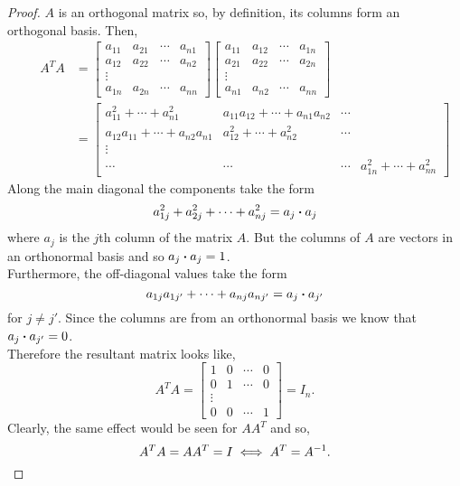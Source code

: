 \documentclass[../MathsNotesBase.tex]{subfiles}
\begin{document}
{		\bigskip
		\begin{proof}
			$A$ is an orthogonal matrix so, by definition, its columns form an orthogonal basis. Then,
			\begin{align*}
				&& A^TA &=
				\begin{bmatrix}
					a_{11} & a_{21} & \cdots & a_{n1}\\
					a_{12} & a_{22} & \cdots & a_{n2}\\
					\vdots \\
					a_{1n} & a_{2n} & \cdots & a_{nn}
				\end{bmatrix}
				\begin{bmatrix}
					a_{11} & a_{12} & \cdots & a_{1n}\\
					a_{21} & a_{22} & \cdots & a_{2n}\\
					\vdots \\
					a_{n1} & a_{n2} & \cdots & a_{nn}
				\end{bmatrix} \\
				&&  &= \begin{bmatrix}
					a_{11}^2 + \cdots + a_{n1}^2 & a_{11}a_{12} + \cdots + a_{n1}a_{n2} & \cdots\\
					a_{12}a_{11} + \cdots + a_{n2}a_{n1} & a_{12}^2 + \cdots + a_{n2}^2 & \cdots\\
					\vdots \\
					\cdots & \cdots & \cdots & a_{1n}^2 + \cdots + a_{nn}^2
				\end{bmatrix}
			\end{align*}
			Along the main diagonal the components take the form
			\[ a_{1j}^2 + a_{2j}^2 + \cdots + a_{nj}^2 = a_j \boldsymbol{\cdot} a_j \]
			where ${ a_j }$ is the $j$th column of the matrix $A$. But the columns of $A$ are vectors in an orthonormal basis and so ${ a_j \boldsymbol{\cdot} a_j= 1 }$.\\
			Furthermore, the off-diagonal values take the form
			\[ a_{1j}a_{1j'} + \cdots + a_{nj}a_{nj'} = a_j \boldsymbol{\cdot} a_{j'} \]
			for ${ j \neq j' }$. Since the columns are from an orthonormal basis we know that ${ a_j \boldsymbol{\cdot} a_{j'} = 0 }$.\\
			Therefore the resultant matrix looks like,
			\[ A^TA = \begin{bmatrix}
				1 & 0 & \cdots & 0\\
				0 & 1 & \cdots & 0\\
				\vdots\\
				0 & 0 & \cdots & 1
			\end{bmatrix}
			= I_n.
			\]
			Clearly, the same effect would be seen for ${ AA^T }$ and so,
			\[ A^TA = AA^T = I \iff A^T = {A}^{-1}. \]
			

\end{proof}}
\end{document}
